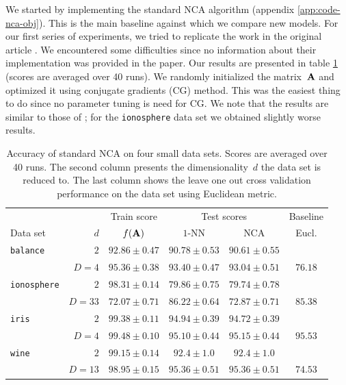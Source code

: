 We started by implementing the standard NCA algorithm (appendix \ref{app:code-nca-obj}). This is the main baseline against which we compare new models.  
For our first series of experiments, we tried to replicate the work in the original article \citep{goldberger2004}. We encountered some difficulties since no information about their implementation was provided in the paper. Our results are presented in table \ref{table:eval-baseline} (scores are averaged over 40 runs). We randomly initialized the matrix~$\mathbf{A}$ and optimized it using conjugate gradients (CG) method. This was the easiest thing to do since no parameter tuning is need for CG. We note that the results are similar to those of \citet{goldberger2004}; for the \texttt{ionosphere} data set we obtained slightly worse results.

\begin{table}
  \centering\begin{tabular}{lrcccc}
  \toprule
	  &     & Train score  & \multicolumn{2}{c}{Test scores} & Baseline \\
  \cmidrule(r){3-3} \cmidrule(r){4-5} \cmidrule(r){6-6}
  Data set & $d$ & $f(\mathbf{A})$ & $1$-NN & NCA & Eucl. \\
  \midrule
    \texttt{balance}&$2$&$92.86 \pm 0.47$&$90.78 \pm 0.53$&$90.61 \pm 0.55$&\\ 
		    &$D=4$&$95.36 \pm 0.38$&$93.40 \pm 0.47$&$93.04 \pm 0.51$&$76.18$\\ 
    \midrule
    \texttt{ionosphere}&$2$&$98.31 \pm 0.14$&$79.86 \pm 0.75$&$79.74 \pm 0.78$&\\ 
		       &$D=33$&$72.07 \pm 0.71$&$86.22 \pm 0.64$&$72.87 \pm 0.71$&$85.38$\\ 
    \midrule
    \texttt{iris}&$2$&$99.38 \pm 0.11$&$94.94 \pm 0.39$&$94.72 \pm 0.39$&\\ 
		 &$D=4$&$99.48 \pm 0.10$&$95.10 \pm 0.44$&$95.15 \pm 0.44$&$95.53$\\
    \midrule
    \texttt{wine}&$2$&$99.15 \pm 0.14$&$92.4 \pm 1.0$&$92.4 \pm 1.0$&\\ 
		 &$D=13$&$98.95 \pm 0.15$&$95.36 \pm 0.51$&$95.36 \pm 0.51$&$74.53$\\ 
  \bottomrule
  \end{tabular}
  \caption[NCA accuracy on four small data sets]{Accuracy of standard NCA on four small data sets. Scores are averaged over 40 runs. The second column presents the dimensionality~$d$ the data set is reduced to. The last column shows the leave one out cross validation performance on the data set using Euclidean metric.}
  \label{table:eval-baseline}
\end{table}

